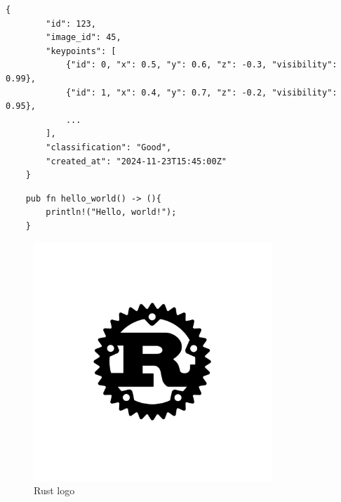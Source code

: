 \begin{lstlisting}[caption=识别结果表数据示例, label=listing:result_table_sample]
    {
        "id": 123,
        "image_id": 45,
        "keypoints": [
            {"id": 0, "x": 0.5, "y": 0.6, "z": -0.3, "visibility": 0.99},
            {"id": 1, "x": 0.4, "y": 0.7, "z": -0.2, "visibility": 0.95},
            ...
        ],
        "classification": "Good",
        "created_at": "2024-11-23T15:45:00Z"
    }
\end{lstlisting}

\begin{verbatim}
    pub fn hello_world() -> (){
        println!("Hello, world!");
    }
\end{verbatim}

\begin{figure}[H]
    \centering
    \includegraphics[width=0.8\textwidth]{images/rust-logo-blk-whitebg-2160.png}
    \caption{Rust logo}
    \label{fig:file-tree}
\end{figure}